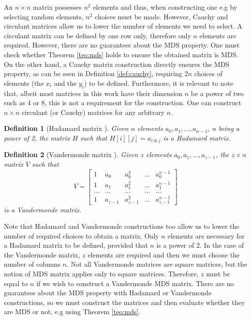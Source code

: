\documentclass{report}
\newtheorem{definition}{Definition}{\bfseries}{\itshape}
\begin{document}
An $n\times n$ matrix possesses $n^2$ elements and thus, when constructing one e.g by selecting random elements, $n^2$ choices must be made. However, Cauchy and circulant matrices allow us to lower the number of elements we need to select. A circulant matrix can be defined by one row only, therefore only $n$ elements are required. However, there are no guarantees about the MDS property. One must check whether Theorem \ref{teo:mds} holds to ensure the obtained matrix is MDS. On the other hand, a Cauchy matrix construction directly ensures the MDS property, as can be seen in Definition \ref{def:cauchy}, requiring $2n$ choices of elements (the $x_i$ and the $y_i$) to be defined. Furthermore, it is relevant to note that, albeit most matrices in this work have their dimension $n$ be a power of two such as 4 or 8, this is not a requirement for the construction. One can construct $n \times n$ circulant (or Cauchy) matrices for any arbitrary $n$.

\begin{definition}[Hadamard matrix \cite{beauchamp1975walsh}]\label{def:hadamard}
Given $n$ elements $a_0, a_1, ..., a_{n-1}$, $n$ being a power of 2, the matrix $H$ such that $H[i][j] = a_{i \oplus j}$ is a Hadamard matrix.
\end{definition}

\begin{definition}[Vandermonde matrix \cite{hoffmann1971linear}]
Given $z$ elements $a_0, a_1, ..., a_{z-1}$, the $z \times n$ matrix $V$ such that
\begin{equation}\label{eq:cost}
V =
\begin{bmatrix}
1 & a_0 & a_0^2 & ... & a_0^{n-1}\\
1 & a_1 & a_1^2 & ... & a_1^{n-1}\\
... & ... & ... & ... & ...\\
1 & a_{z-1} & a_{z-1}^2 & ... & a_{z-1}^{n-1}
\end{bmatrix}
\end{equation}
is a Vandermonde matrix.
\end{definition}

Note that Hadamard and Vandermonde constructions too allow us to lower the number of required choices to obtain a matrix. Only $n$ elements are necessary for a Hadamard matrix to be defined, provided that $n$ is a power of 2. In the case of the Vandermonde matrix, $z$ elements are required and then we must choose the number of columns $n$. Not all Vandermonde matrices are square matrices, but the notion of MDS matrix applies only to square matrices. Therefore, $z$ must be equal to $n$ if we wish to construct a Vandermonde MDS matrix. There are no guarantees about the MDS property with Hadamard or Vandermonde constructions, so we must construct the matrices and then evaluate whether they are MDS or not, e.g using Theorem \ref{teo:mds}.
\end{document}
